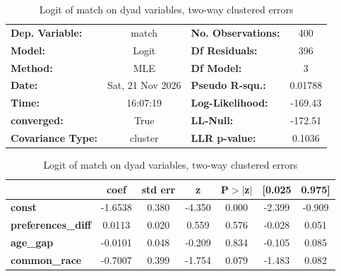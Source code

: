 \begin{table}[htbp]
\centering
\scriptsize
\begin{center}
\begin{tabular}{lclc}
\toprule
\textbf{Dep. Variable:}    &      match       & \textbf{  No. Observations:  } &      400    \\
\textbf{Model:}            &      Logit       & \textbf{  Df Residuals:      } &      396    \\
\textbf{Method:}           &       MLE        & \textbf{  Df Model:          } &        3    \\
\textbf{Date:}             & Sat, 21 Nov 2026 & \textbf{  Pseudo R-squ.:     } &  0.01788    \\
\textbf{Time:}             &     16:07:19     & \textbf{  Log-Likelihood:    } &   -169.43   \\
\textbf{converged:}        &       True       & \textbf{  LL-Null:           } &   -172.51   \\
\textbf{Covariance Type:}  &     cluster      & \textbf{  LLR p-value:       } &   0.1036    \\
\bottomrule
\end{tabular}
\begin{tabular}{lcccccc}
                           & \textbf{coef} & \textbf{std err} & \textbf{z} & \textbf{P$> |$z$|$} & \textbf{[0.025} & \textbf{0.975]}  \\
\midrule
\textbf{const}             &      -1.6538  &        0.380     &    -4.350  &         0.000        &       -2.399    &       -0.909     \\
\textbf{preferences\_diff} &       0.0113  &        0.020     &     0.559  &         0.576        &       -0.028    &        0.051     \\
\textbf{age\_gap}          &      -0.0101  &        0.048     &    -0.209  &         0.834        &       -0.105    &        0.085     \\
\textbf{common\_race}      &      -0.7007  &        0.399     &    -1.754  &         0.079        &       -1.483    &        0.082     \\
\bottomrule
\end{tabular}
\end{center}
\caption{Logit of match on dyad variables, two-way clustered errors}
\label{tab:q7_logit}
\end{table}
